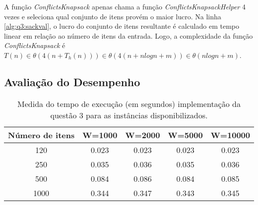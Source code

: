 \documentclass[a4paper]{article}
\begin{document}
A função \emph{ConflictsKnapsack} apenas chama a função \emph{ConflictsKnapsackHelper} 4 vezes e seleciona qual conjunto de itens provém o maior lucro. Na linha \ref{alg:q3:sackval}, o lucro do conjunto de itens resultante é calculado em tempo linear em relação ao número de itens da entrada. Logo, a complexidade da função \emph{ConflictsKnapsack} é $T(n) \in \theta(4(n + T_h(n))) \in \theta(4(n + nlogn + m)) \in \theta(nlogn + m)$.

\subsection{Avaliação do Desempenho}

\begin{table}[H]
\centering
\begin{tabular}{c|c|c|c|c}
Número de itens & W=1000 & W=2000 & W=5000 & W=10000 \\
\hline
120 & 0.023	& 0.023	& 0.023	& 0.023	\\
250 & 0.035	& 0.036	& 0.035	& 0.036	\\
500 & 0.084	& 0.086	& 0.084	& 0.085	\\
1000 & 0.344	& 0.347	& 0.343	& 0.345	\\
\end{tabular}
\caption{Medida do tempo de execução (em segundos) implementação da questão 3 para as instâncias disponibilizados.}
\label{tab:q3:bench}
\end{table}
\end{document}

